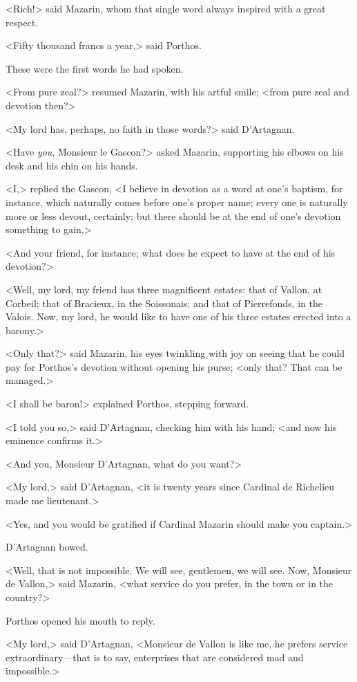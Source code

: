 <Rich!> said Mazarin, whom that single word always inspired with a great respect.

<Fifty thousand francs a year,> said Porthos.

These were the first words he had spoken.

<From pure zeal?> resumed Mazarin, with his artful smile; <from pure zeal and devotion then?>

<My lord has, perhaps, no faith in those words?> said D'Artagnan.

<Have \textit{you}, Monsieur le Gascon?> asked Mazarin, supporting his elbows on his desk and his chin on his hands.

<I,> replied the Gascon, <I believe in devotion as a word at one's baptism, for instance, which naturally comes before one's proper name; every one is naturally more or less devout, certainly; but there should be at the end of one's devotion something to gain.>

<And your friend, for instance; what does he expect to have at the end of his devotion?>

<Well, my lord, my friend has three magnificent estates: that of Vallon, at Corbeil; that of Bracieux, in the Soissonais; and that of Pierrefonds, in the Valois. Now, my lord, he would like to have one of his three estates erected into a barony.>

<Only that?> said Mazarin, his eyes twinkling with joy on seeing that he could pay for Porthos's devotion without opening his purse; <only that? That can be managed.>

<I shall be baron!> explained Porthos, stepping forward.

<I told you so,> said D'Artagnan, checking him with his hand; <and now his eminence confirms it.>

<And you, Monsieur D'Artagnan, what do you want?>

<My lord,> said D'Artagnan, <it is twenty years since Cardinal de Richelieu made me lieutenant.>

<Yes, and you would be gratified if Cardinal Mazarin should make you captain.>

D'Artagnan bowed.

<Well, that is not impossible. We will see, gentlemen, we will see. Now, Monsieur de Vallon,> said Mazarin, <what service do you prefer, in the town or in the country?>

Porthos opened his mouth to reply.

<My lord,> said D'Artagnan, <Monsieur de Vallon is like me, he prefers service extraordinary—that is to say, enterprises that are considered mad and impossible.>

